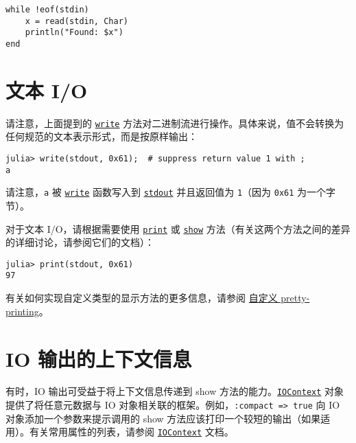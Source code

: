 \begin{verbatim}
while !eof(stdin)
    x = read(stdin, Char)
    println("Found: $x")
end
\end{verbatim}



\hypertarget{14803809014545196748}{}


\section{文本 I/O}



请注意，上面提到的 \hyperlink{16947913578760238729}{\texttt{write}} 方法对二进制流进行操作。具体来说，值不会转换为任何规范的文本表示形式，而是按原样输出：




\begin{verbatim}
julia> write(stdout, 0x61);  # suppress return value 1 with ;
a
\end{verbatim}



请注意，\texttt{a} 被 \hyperlink{16947913578760238729}{\texttt{write}} 函数写入到 \hyperlink{18181294266083891471}{\texttt{stdout}} 并且返回值为 \texttt{1}（因为 \texttt{0x61} 为一个字节）。



对于文本 I/O，请根据需要使用 \hyperlink{8248717042415202230}{\texttt{print}} 或 \hyperlink{4561869563484222675}{\texttt{show}} 方法（有关这两个方法之间的差异的详细讨论，请参阅它们的文档）：




\begin{verbatim}
julia> print(stdout, 0x61)
97
\end{verbatim}



有关如何实现自定义类型的显示方法的更多信息，请参阅 \hyperlink{5246022684399876238}{自定义 pretty-printing}。



\hypertarget{11059597754503252223}{}


\section{IO 输出的上下文信息}



有时，IO 输出可受益于将上下文信息传递到 show 方法的能力。\hyperlink{13454403377667762339}{\texttt{IOContext}} 对象提供了将任意元数据与 IO 对象相关联的框架。例如，\texttt{:compact => true} 向 IO 对象添加一个参数来提示调用的 show 方法应该打印一个较短的输出（如果适用）。有关常用属性的列表，请参阅 \hyperlink{13454403377667762339}{\texttt{IOContext}} 文档。



